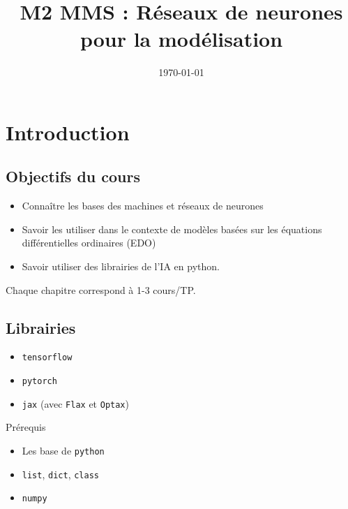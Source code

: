 \documentclass[11pt,a4paper]{article}
\title{M2 MMS : Réseaux de neurones pour la modélisation}
\author{}
\date{\today}
\begin{document}

\maketitle
\tableofcontents
%
\section*{Introduction}\label{sec:}
%
\subsection*{Objectifs du cours}\label{subsec:}
%
\begin{itemize}
\item Connaître les bases des machines et réseaux de neurones
\item Savoir les utiliser dans le contexte de modèles basées sur les équations différentielles ordinaires (EDO)
\item Savoir utiliser des librairies de l'IA en python.
\end{itemize}
%
Chaque chapitre correspond à 1-3 cours/TP.
%
\subsection*{Librairies}\label{subsec:}
%
\begin{itemize}
\item \texttt{tensorflow}
\item \texttt{pytorch}
\item \texttt{jax} (avec \texttt{Flax} et \texttt{Optax})
\end{itemize}
%
Prérequis
\begin{itemize}
\item Les base de \texttt{python}
\item \texttt{list}, \texttt{dict}, \texttt{class}
\item \texttt{numpy}
\end{itemize}
%
\end{document}
